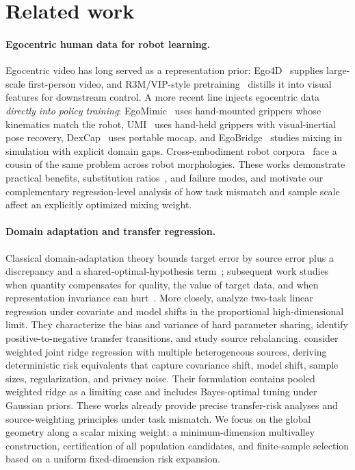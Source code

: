 \section{Related work}
\label{sec:related}

\paragraph{Egocentric human data for robot learning.}
Egocentric video has long served as a representation prior: Ego4D~\cite{grauman2022ego4d} supplies large-scale first-person video, and R3M/VIP-style pretraining~\cite{nair2022r3m,ma2022vip} distills it into visual features for downstream control.
A more recent line injects egocentric data \emph{directly into policy training}: EgoMimic~\cite{kareer2024egomimic} uses hand-mounted grippers whose kinematics match the robot, UMI~\cite{chi2024universal} uses hand-held grippers with visual-inertial pose recovery, DexCap~\cite{wang2024dexcap} uses portable mocap, and EgoBridge~\cite{egobridge2025} studies mixing in simulation with explicit domain gaps.
Cross-embodiment robot corpora~\cite{openx2024} face a cousin of the same problem across robot morphologies.
These works demonstrate practical benefits, substitution ratios~\cite{zevaego2025}, and failure modes, and motivate our complementary regression-level analysis of how task mismatch and sample scale affect an explicitly optimized mixing weight.

\paragraph{Domain adaptation and transfer regression.}
Classical domain-adaptation theory bounds target error by source error plus a discrepancy and a shared-optimal-hypothesis term~\cite{bendavid2010theory}; subsequent work studies when quantity compensates for quality, the value of target data, and when representation invariance can hurt~\cite{bendavid2014quantity,hanneke2019value,zhao2019learning}.
More closely, \cite{yang2025precise} analyze two-task linear regression under covariate and model shifts in the proportional high-dimensional limit. They characterize the bias and variance of hard parameter sharing, identify positive-to-negative transfer transitions, and study source rebalancing.
\cite{kovacevic2026private} consider weighted joint ridge regression with multiple heterogeneous sources, deriving deterministic risk equivalents that capture covariance shift, model shift, sample sizes, regularization, and privacy noise. Their formulation contains pooled weighted ridge as a limiting case and includes Bayes-optimal tuning under Gaussian priors.
These works already provide precise transfer-risk analyses and source-weighting principles under task mismatch. We focus on the global geometry along a scalar mixing weight: a minimum-dimension multivalley construction, certification of all population candidates, and finite-sample selection based on a uniform fixed-dimension risk expansion.

